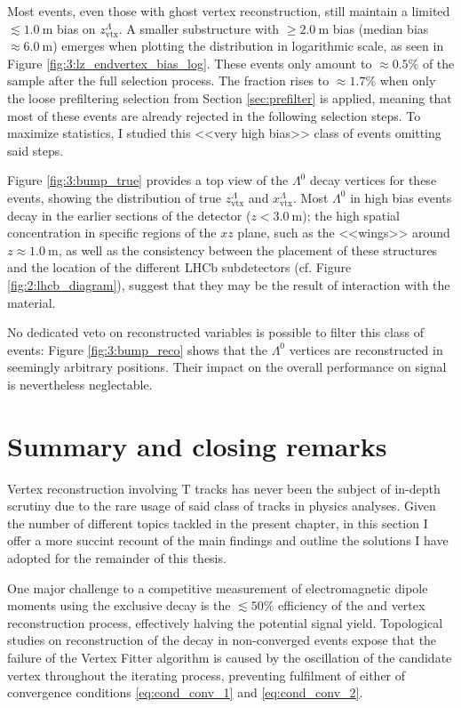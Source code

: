 Most \demonstratorshort events, even those with ghost vertex reconstruction, still maintain a limited $\lesssim \SI{1.0}{\meter}$ bias on $z_\text{vtx}^\Lambda$.
A smaller substructure with $\geq \SI{2.0}{\meter}$ bias (median bias $\approx \SI{6.0}{\meter}$) emerges when plotting the distribution in logarithmic scale, as seen in Figure \ref{fig:3:lz_endvertex_bias_log}.
These events only amount to $\approx 0.5\%$ of the sample after the full selection process.
The fraction rises to $\approx 1.7\%$ when only the loose prefiltering selection from Section \ref{sec:prefilter} is applied, meaning that most of these events are already rejected in the following selection steps.
To maximize statistics, I studied this <<very high bias>> class of events omitting said steps.

Figure \ref{fig:3:bump_true} provides a top view of the $\Lambda^0$ decay vertices for these events, showing the distribution of true $z_\text{vtx}^\Lambda$ and $x_\text{vtx}^\Lambda$.
Most $\Lambda^0$ in high bias events decay in the earlier sections of the detector ($z<\SI{3.0}{\meter}$);
the high spatial concentration in specific regions of the $xz$ plane, such as the <<wings>> around $z\approx \SI{1.0}{\meter}$, as well as the consistency between the placement of these structures and the location of the different LHCb subdetectors (cf. Figure \ref{fig:2:lhcb_diagram}), suggest that they may be the result of interaction with the material.

No dedicated veto on reconstructed variables is possible to filter this class of events:
Figure \ref{fig:3:bump_reco} shows that the $\Lambda^0$ vertices are reconstructed in seemingly arbitrary positions.
Their impact on the overall performance on signal is nevertheless neglectable.

\section{Summary and closing remarks}
\label{sec:3:cap3_conclusions}

Vertex reconstruction involving T tracks has never been the subject of in-depth scrutiny due to the rare usage of said class of tracks in physics analyses.
Given the number of different topics tackled in the present chapter, in this section I offer a more succint recount of the main findings and outline the solutions I have adopted for the remainder of this thesis.

One major challenge to a competitive measurement of \lz electromagnetic dipole moments using the exclusive \demonstratorfull decay is the $\lesssim 50\%$ efficiency of the \lz and \lbz vertex reconstruction process, effectively halving the potential signal yield.
Topological studies on reconstruction of the \lambdadecay decay in non-converged events expose that the failure of the Vertex Fitter algorithm is caused by the oscillation of the \lz candidate vertex throughout the iterating process, preventing fulfilment of either of convergence conditions \eqref{eq:cond_conv_1} and \eqref{eq:cond_conv_2}.

